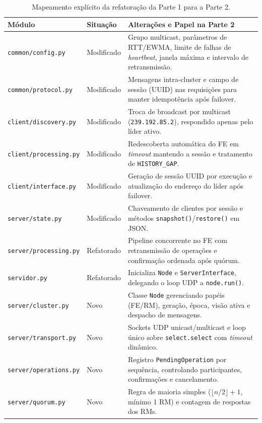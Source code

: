 \documentclass[12pt]{article}
\begin{document}
\begin{table}[H]
\centering
\caption{Mapeamento explícito da refatoração da Parte 1 para a Parte 2.}
\label{tab:evolucao}
\scriptsize
\begin{tabularx}{\textwidth}{l l X}
\toprule
\textbf{Módulo} & \textbf{Situação} & \textbf{Alterações e Papel na Parte 2} \\
\midrule
\texttt{common/config.py} & Modificado & Grupo multicast, parâmetros de RTT/EWMA, limite de falhas de \textit{heartbeat}, janela máxima e intervalo de retransmissão. \\
\texttt{common/protocol.py} & Modificado & Mensagens intra-cluster e campo de sessão (UUID) nas requisições para manter idempotência após failover. \\
\texttt{client/discovery.py} & Modificado & Troca de broadcast por multicast (\texttt{239.192.85.2}), respondido apenas pelo líder ativo. \\
\texttt{client/processing.py} & Modificado & Redescoberta automática do FE em \textit{timeout} mantendo a sessão e tratamento de \texttt{HISTORY\_GAP}. \\
\texttt{client/interface.py} & Modificado & Geração de sessão UUID por execução e atualização do endereço do líder após failover. \\
\texttt{server/state.py} & Modificado & Chaveamento de clientes por sessão e métodos \texttt{snapshot()}/\texttt{restore()} em JSON. \\
\texttt{server/processing.py} & Refatorado & Pipeline concorrente no FE com retransmissão de operações e confirmação ordenada após quórum. \\
\texttt{servidor.py} & Refatorado & Inicializa \texttt{Node} e \texttt{ServerInterface}, delegando o loop UDP a \texttt{node.run()}. \\
\texttt{server/cluster.py} & Novo & Classe \texttt{Node} gerenciando papéis (FE/RM), geração, época, visão ativa e despacho de mensagens. \\
\texttt{server/transport.py} & Novo & Sockets UDP unicast/multicast e loop único sobre \texttt{select.select} com \textit{timeout} dinâmico. \\
\texttt{server/operations.py} & Novo & Registro \texttt{PendingOperation} por sequência, controlando participantes, confirmações e cancelamento. \\
\texttt{server/quorum.py} & Novo & Regra de maioria simples ($\lfloor n/2 \rfloor + 1$, mínimo 1 RM) e contagem de respostas dos RMs. \\

\end{tabularx}
\end{table}
\end{document}
